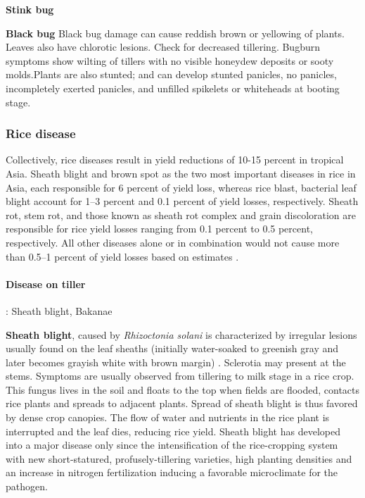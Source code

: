 \textbf{Stink bug}

\textbf{Black bug}
Black bug damage can cause reddish brown or yellowing of plants. Leaves also have chlorotic lesions. Check for decreased tillering. Bugburn symptoms show wilting of tillers with no visible honeydew deposits or sooty molds.Plants are also stunted; and can develop stunted panicles, no panicles, incompletely exerted panicles, and unfilled spikelets or whiteheads at booting stage.

\subsubsection*{Rice disease}

Collectively, rice diseases result in yield reductions of 10-15 percent in tropical Asia. Sheath blight and brown spot as the two most important diseases in rice in Asia, each responsible for 6 percent of yield loss, whereas rice blast, bacterial leaf blight account for 1–3 percent and 0.1 percent of yield losses, respectively. Sheath rot, stem rot, and those known as sheath rot complex and grain discoloration are responsible for rice yield losses ranging from 0.1 percent to 0.5 percent, respectively. All other diseases alone or in combination would not cause more than 0.5–1 percent of yield losses based on estimates \citep{Savary:2000vr, mew2002handbook}.

\paragraph{Disease on tiller}: Sheath blight, Bakanae

\textbf{Sheath blight}, caused by \textit{Rhizoctonia solani} is characterized by irregular lesions usually found on the leaf sheaths (initially water-soaked to greenish gray and later becomes grayish white with brown margin) \citep{irrisheathblight}. Sclerotia may present at the stems. Symptoms are usually observed from tillering to milk stage in a rice crop. This fungus lives in the soil and floats to the top when fields are flooded, contacts rice plants and spreads to adjacent plants. Spread of sheath blight is thus favored by dense crop canopies. The flow of water and nutrients in the rice plant is interrupted and the leaf dies, reducing rice yield. Sheath blight has developed into a major disease only since the intensification of the rice-cropping system with new short-statured, profusely-tillering varieties, high planting densities and an increase in nitrogen fertilization inducing a favorable microclimate for the pathogen. 

